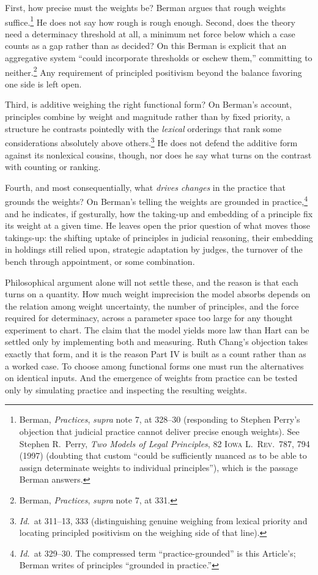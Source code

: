 First, how precise must the weights be? Berman argues that rough weights
suffice.\footnote{Berman, \textit{Practices}, \textit{supra} note 7, at
328--30 (responding to Stephen Perry's objection that judicial practice
cannot deliver precise enough weights). See Stephen R.\ Perry, \textit{Two Models of Legal Principles}, 82
\textsc{Iowa L.\ Rev.}\ 787, 794 (1997) (doubting that custom ``could be
sufficiently nuanced as to be able to assign determinate weights to
individual principles''), which is the passage Berman answers.} He does not say how rough is rough enough. Second,
does the theory need a determinacy threshold at all, a minimum net force below
which a case counts as a gap rather than as decided? On this Berman is
explicit that an aggregative system ``could incorporate thresholds or
eschew them,'' committing to neither.\footnote{Berman, \textit{Practices},
\textit{supra} note 7, at 331.} Any requirement of principled positivism
beyond the balance favoring one side is left open.

Third, is additive weighing the right functional form? On Berman's account,
principles combine by weight and magnitude rather than by fixed priority, a
structure he contrasts pointedly with the \textit{lexical} orderings that
rank some considerations absolutely above others.\footnote{\textit{Id.}\ at 311--13,
333 (distinguishing genuine weighing from lexical priority and locating
principled positivism on the weighing side of that line).} He does not defend the additive form against its nonlexical cousins,
though, nor does he say what turns on the contrast with counting or
ranking.

Fourth, and most consequentially, what \textit{drives changes} in the
practice that grounds the weights? On Berman's telling the weights are
grounded in practice,\footnote{\textit{Id.}\ at 329--30. The compressed
term ``practice-grounded'' is this Article's; Berman writes of principles
``grounded in practice.''} and he indicates, if
gesturally, how the taking-up and embedding of a principle fix its weight at
a given time. He leaves open the prior question of what moves those
takings-up: the shifting uptake of principles in judicial reasoning, their
embedding in holdings still relied upon, strategic adaptation by judges, the
turnover of the bench through appointment, or some combination.

Philosophical argument alone will not settle these, and the reason is that
each turns on a quantity. How much weight imprecision the model absorbs
depends on the relation among weight uncertainty, the number of principles,
and the force required for determinacy, across a parameter space too large
for any thought experiment to chart. The claim that the model yields more law than Hart can be
settled only by implementing both and measuring. Ruth Chang's objection
takes exactly that form, and it is the reason Part IV is built as a count
rather than as a worked case. To choose among
functional forms one must run the alternatives on identical inputs. And the
emergence of weights from practice can be tested only by simulating practice
and inspecting the resulting weights.

